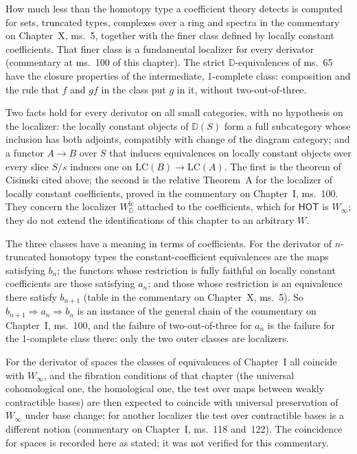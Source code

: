 How much less than the homotopy type a coefficient theory detects is computed for sets, truncated types, complexes over a ring and spectra in the commentary on Chapter~X, ms.~5, together with the finer class defined by locally constant coefficients. That finer class is a fundamental localizer for every derivator (commentary at ms.~100 of this chapter). The strict $\mathbb D$-equivalences of ms.~65 have the closure properties of the intermediate, 1-complete class: composition and the rule that $f$ and $gf$ in the class put $g$ in it, without two-out-of-three.

Two facts hold for every derivator on all small categories, with no hypothesis on the localizer: the locally constant objects of $\mathbb D(S)$ form a full subcategory whose inclusion has both adjoints, compatibly with change of the diagram category; and a functor $A\to B$ over $S$ that induces equivalences on locally constant objects over every slice $S/s$ induces one on $\mathrm{LC}(B)\to\mathrm{LC}(A)$. The first is the theorem of Cisinski cited above; the second is the relative Theorem~A for the localizer of locally constant coefficients, proved in the commentary on Chapter~I, ms.~100. They concern the localizer $W^{\mathrm{lc}}_{\mathbb D}$ attached to the coefficients, which for $\mathsf{HOT}$ is $W_\infty$; they do not extend the identifications of this chapter to an arbitrary $W$.

The three classes have a meaning in terms of coefficients. For the derivator of $n$-truncated homotopy types the constant-coefficient equivalences are the maps satisfying $b_n$; the functors whose restriction is fully faithful on locally constant coefficients are those satisfying $a_n$; and those whose restriction is an equivalence there satisfy $b_{n+1}$ (table in the commentary on Chapter~X, ms.~5). So $b_{n+1}\Rightarrow a_n\Rightarrow b_n$ is an instance of the general chain of the commentary on Chapter~I, ms.~100, and the failure of two-out-of-three for $a_n$ is the failure for the 1-complete class there: only the two outer classes are localizers.

For the derivator of spaces the classes of equivalences of Chapter~I all coincide with $W_\infty$, and the fibration conditions of that chapter (the universal cohomological one, the homological one, the test over maps between weakly contractible bases) are then expected to coincide with universal preservation of $W_\infty$ under base change; for another localizer the test over contractible bases is a different notion (commentary on Chapter~I, ms.~118 and~122). The coincidence for spaces is recorded here as stated; it was not verified for this commentary.

